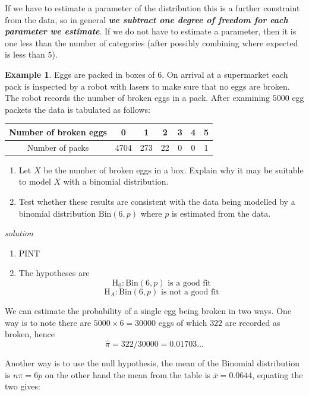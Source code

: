 \documentclass[
]{book}
\theoremstyle{definition}
\theoremstyle{definition}
\newtheorem{example}{Example}[chapter]
\theoremstyle{definition}
\theoremstyle{definition}
\theoremstyle{remark}
\begin{document}
If we have to estimate a parameter of the distribution this is a further constraint from the data, so in general \textbf{\emph{we subtract one degree of freedom for each parameter we estimate}}. If we do not have to estimate a parameter, then it is one less than the number of categories (after possibly combining where expected is less than \(5\)).

\begin{example}

Eggs are packed in boxes of \(6\). On arrival at a supermarket each pack is inspected by a robot with lasers to make sure that no eggs are broken. The robot records the number of broken eggs in a pack. After examining \(5000\) egg packets the data is tabulated as follows:

\begin{longtable}[]{@{}ccccccc@{}}
\toprule
Number of broken eggs & 0 & 1 & 2 & 3 & 4 & 5\tabularnewline
\midrule
\endhead
Number of packs & 4704 & 273 & 22 & 0 & 0 & 1\tabularnewline
\bottomrule
\end{longtable}

\begin{enumerate}
\def\labelenumi{\alph{enumi})}
\item
  Let \(X\) be the number of broken eggs in a box. Explain why it may be suitable to model \(X\) with a binomial distribution.
\item
  Test whether these results are consistent with the data being modelled by a binomial distribution \(\text{Bin}(6,p)\) where \(p\) is estimated from the data.
\end{enumerate}

\end{example}

\emph{solution}

\begin{enumerate}
\def\labelenumi{\alph{enumi})}
\item
  PINT
\item
  The hypotheses are
  \[\text{H}_0: \text{Bin}(6,p) \text{ is a good fit}\]
  \[\text{H}_A: \text{Bin}(6,p) \text{ is not a good fit}\]
\end{enumerate}

We can estimate the probability of a single egg being broken in two ways. One way is to note there are \(5000\times 6 = 30000\) eggs of which \(322\) are recorded as broken, hence \[\hat{\pi}=322/30000=0.01703\ldots\]

Another way is to use the null hypothesis, the mean of the Binomial distribution is \(n\pi = 6p\) on the other hand the mean from the table is \(\bar{x}= 0.0644\), equating the two gives:
\end{document}
